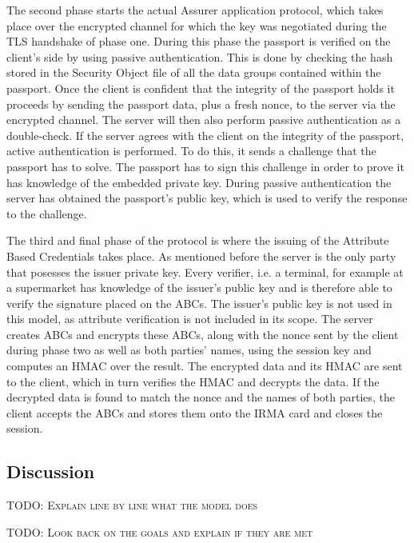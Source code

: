 The second phase starts the actual Assurer application protocol, which takes place over the encrypted channel for which the key was negotiated during the TLS handshake of phase one. During this phase the passport is verified on the client's side by using passive authentication. This is done by checking the hash stored in the Security Object file of all the data groups contained within the passport. Once the client is confident that the integrity of the passport holds it proceeds by sending the passport data, plus a fresh nonce, to the server via the encrypted channel. The server will then also perform passive authentication as a double-check. If the server agrees with the client on the integrity of the passport, active authentication is performed. To do this, it sends a challenge that the passport has to solve. The passport has to sign this challenge in order to prove it has knowledge of the embedded private key. During passive authentication the server has obtained the passport's public key, which is used to verify the response to the challenge.

The third and final phase of the protocol is where the issuing of the Attribute Based Credentials takes place. As mentioned before the server is the only party that posesses the issuer private key. Every verifier, i.e. a terminal, for example at a supermarket has knowledge of the issuer's public key and is therefore able to verify the signature placed on the ABCs. The issuer's public key is not used in this model, as attribute verification is not included in its scope. The server creates ABCs and encrypts these ABCs, along with the nonce sent by the client during phase two as well as both parties' names, using the session key and computes an HMAC over the result. The encrypted data and its HMAC are sent to the client, which in turn verifies the HMAC and decrypts the data. If the decrypted data is found to match the nonce and the names of both parties, the client accepts the ABCs and stores them onto the IRMA card and closes the session.


\subsection{Discussion}
\textsc{TODO: Explain line by line what the model does}

\textsc{TODO: Look back on the goals and explain if they are met}